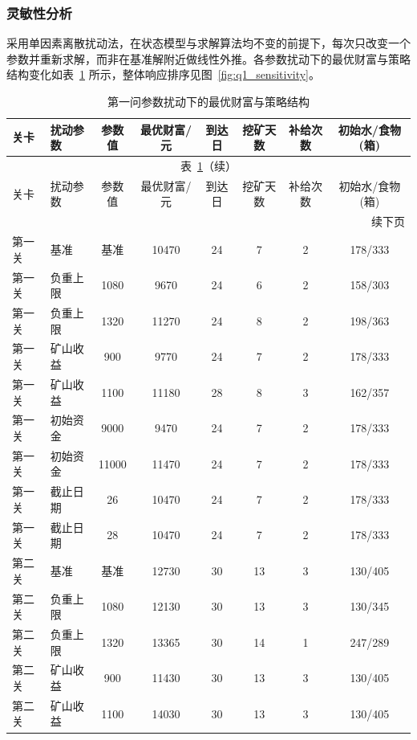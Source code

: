 \documentclass{cumcmthesis}
\numberwithin{equation}{section}
\numberwithin{figure}{section}
\numberwithin{table}{section}
\begin{document}
\subsubsection{灵敏性分析}

采用单因素离散扰动法，在状态模型与求解算法均不变的前提下，每次只改变一个参数并重新求解，而非在基准解附近做线性外推。各参数扰动下的最优财富与策略结构变化如表~\ref{tab:q1_sens} 所示，整体响应排序见图~\ref{fig:q1_sensitivity}。

{
\begin{longtable}{llcccccc}
    \caption{第一问参数扰动下的最优财富与策略结构}
    \label{tab:q1_sens} \\
    \toprule
    关卡 & 扰动参数 & 参数值 & 最优财富/元 & 到达日 & 挖矿天数 & 补给次数 & 初始水/食物(箱) \\
    \midrule
    \endfirsthead

    \multicolumn{8}{c}{表~\ref{tab:q1_sens}（续）} \\
    \toprule
    关卡 & 扰动参数 & 参数值 & 最优财富/元 & 到达日 & 挖矿天数 & 补给次数 & 初始水/食物(箱) \\
    \midrule
    \endhead

    \midrule
    \multicolumn{8}{r}{续下页} \\
    \endfoot

    \bottomrule
    \endlastfoot

    第一关 & 基准 & 基准 & 10470 & 24 & 7 & 2 & 178/333 \\
    第一关 & 负重上限 & 1080 & 9670 & 24 & 6 & 2 & 158/303 \\
    第一关 & 负重上限 & 1320 & 11270 & 24 & 8 & 2 & 198/363 \\
    第一关 & 矿山收益 & 900 & 9770 & 24 & 7 & 2 & 178/333 \\
    第一关 & 矿山收益 & 1100 & 11180 & 28 & 8 & 3 & 162/357 \\
    第一关 & 初始资金 & 9000 & 9470 & 24 & 7 & 2 & 178/333 \\
    第一关 & 初始资金 & 11000 & 11470 & 24 & 7 & 2 & 178/333 \\
    第一关 & 截止日期 & 26 & 10470 & 24 & 7 & 2 & 178/333 \\
    第一关 & 截止日期 & 28 & 10470 & 24 & 7 & 2 & 178/333 \\

    \midrule

    第二关 & 基准 & 基准 & 12730 & 30 & 13 & 3 & 130/405 \\
    第二关 & 负重上限 & 1080 & 12130 & 30 & 13 & 3 & 130/345 \\
    第二关 & 负重上限 & 1320 & 13365 & 30 & 14 & 1 & 247/289 \\
    第二关 & 矿山收益 & 900 & 11430 & 30 & 13 & 3 & 130/405 \\
    第二关 & 矿山收益 & 1100 & 14030 & 30 & 13 & 3 & 130/405 \\
    
\end{longtable}
}
\end{document}
